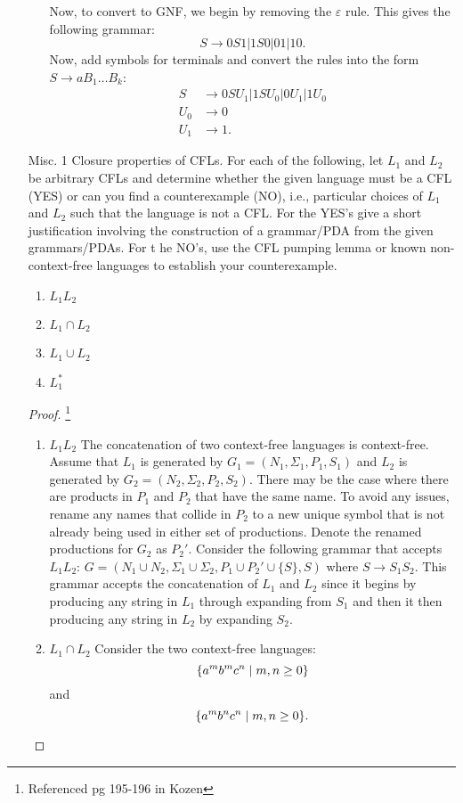 \documentclass{article}
\newcommand{\setst}{\hspace{1mm} | \hspace{1mm} }
\renewcommand{\epsilon}{\varepsilon}
\theoremstyle{definition}
\begin{document}
\begin{enumerate}
\begin{enumerate}
		Now, to convert to GNF, we begin by removing the $\epsilon$ rule. This gives the following grammar:
		\[S \rightarrow 0S1 | 1S0 | 01 | 10.\]
		Now, add symbols for terminals and convert the rules into the form $S \to aB_1\ldots B_k$:
		\begin{align*}
		S &\rightarrow 0SU_1 | 1SU_0 | 0U_1 | 1U_0 \\
		U_0 &\rightarrow 0 \\
		U_1 &\rightarrow 1.
		\end{align*}
	\end{enumerate}
	\item[Misc. 1]
	Closure properties of CFLs. For each of the following, let $L_1$ and $L_2$ be arbitrary CFLs and determine whether the given language must be a CFL (YES) or can you find a counterexample (NO), i.e., particular choices of $L_1$ and $L_2$ such that the language is not a CFL. For the YES's give a short justification involving the construction of a grammar/PDA from the given grammars/PDAs. For t he NO's, use the CFL pumping lemma or known non-context-free languages to establish your counterexample.
	\begin{enumerate}
		\item $L_1L_2$
		\item $L_1 \cap L_2$
		\item $L_1 \cup L_2$ 
		\item $L_1^*$
	\end{enumerate} 
\begin{proof}\footnote{Referenced pg 195-196 in Kozen}
	\leavevmode
	\begin{enumerate}
		\item $L_1L_2$ 
		The concatenation of two context-free languages is context-free. Assume that $L_1$ is generated by $G_1 = (N_1,\Sigma_1,P_1,S_1)$ and $L_2$ is generated by $G_2 = (N_2,\Sigma_2,P_2,S_2)$. There may be the case where there are products in $P_1$ and $P_2$ that have the same name. To avoid any issues, rename any names that collide in $P_2$ to a new unique symbol that is not already being used in either set of productions. Denote the renamed productions for $G_2$ as $P_2'$. Consider the following grammar that accepts $L_1L_2$: $G = (N_1 \cup N_2, \Sigma_1 \cup \Sigma_2, P_1 \cup P_2' \cup \{S\}, S)$ where $S \rightarrow S_1S_2$. This grammar accepts the concatenation of $L_1$ and $L_2$ since it begins by producing any string in $L_1$ through expanding from $S_1$ and then it then producing any string in $L_2$ by expanding $S_2$. 
		\item $L_1 \cap L_2$
		Consider the two context-free languages:
		\[\{a^mb^mc^n \setst m,n \geq 0\}\]
		and
		\[\{a^mb^nc^n\setst m,n \geq 0\}.\]
		

\end{enumerate}
\end{proof}
\end{enumerate}
\end{document}
